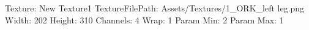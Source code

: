 Texture: New Texture1
TextureFilePath: Assets/Textures/1_ORK_left leg.png
Width: 202
Height: 310
Channels: 4
Wrap: 1
Param Min: 2
Param Max: 1